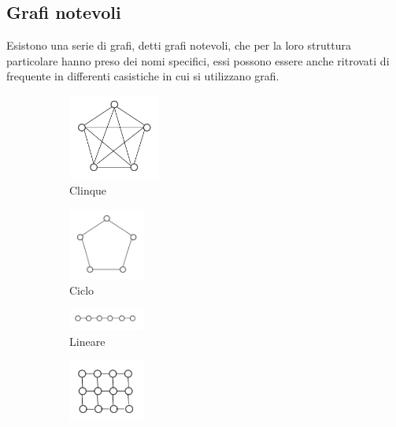 \subsection{Grafi notevoli}
Esistono una serie di grafi, detti grafi notevoli, che per la loro struttura particolare hanno preso dei nomi specifici, essi possono essere anche ritrovati di frequente in differenti casistiche in cui si utilizzano grafi.
\begin{figure}[h!]
    \vspace{-10pt}
    \begin{subfigure}{.3\textwidth}
        \centering
        \includegraphics[width=3cm]{images/clinque.png}
        \vspace{-5pt}
        \caption{Clinque}
    \end{subfigure}
    \hfill
    \begin{subfigure}{.3\textwidth}
        \centering
        \includegraphics[width=2.5cm]{images/ciclo.png}
        \vspace{-5pt}
        \caption{Ciclo}
    \end{subfigure}
    \hfill
    \begin{subfigure}{.3\textwidth}
        \centering
        \includegraphics[width=2.5cm]{images/lineare.png}
        \vspace{-5pt}
        \caption{Lineare}
    \end{subfigure}
    \hfill
    \begin{subfigure}{.3\textwidth}
        \centering
        \includegraphics[width=2.5cm]{images/griglia.png}

\end{subfigure}
\end{figure}
